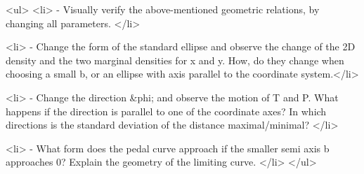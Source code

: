		<ul>
		 <li> - Visually verify the above-mentioned geometric relations, by changing all parameters.
	</li>
	
		<li> - Change the form of the standard ellipse and observe the change of the 2D density and the two marginal densities for x and y. How, do they change when choosing a small b, or an ellipse with axis parallel to the coordinate system.</li>
		
		  <li> - Change the direction &phi; and observe the motion of T and P. What happens if the direction is parallel to one of the coordinate axes? In which directions is the standard deviation of the distance maximal/minimal? </li>
			
		  <li> - What form does the pedal curve approach if the smaller semi axis b approaches 0? Explain the geometry of the limiting curve. </li>
		</ul>
